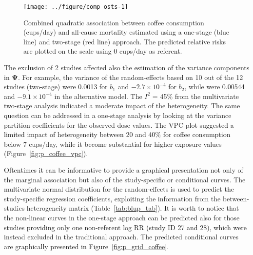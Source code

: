 \documentclass[11pt,a4paper,twoside,openany]{book}\usepackage{knitr}
\begin{document}
{\begin{knitrout}
\begin{figure}[ht!]
{\centering \texttt{[image: ../figure/comp\_osts-1]} 

}

\caption[Combined quadratic association between coffee consumption (cups/day) and all-cause mortality estimated using a one-stage (blue line) and two-stage (red line) approach]{Combined quadratic association between coffee consumption (cups/day) and all-cause mortality estimated using a one-stage (blue line) and two-stage (red line) approach. The predicted relative risks are plotted on the scale using 0 cups/day as referent.}\label{fig:comp_osts}
\end{figure}


\end{knitrout}

\noindent The exclusion of 2 studies affected also the estimation of the variance components in $\boldsymbol{\Psi}$. For example, the variance of the random-effects based on 10 out of the 12 studies (two-stage) were 0.0013 for $b_1$ and \ensuremath{-2.7\times 10^{-4}} for $b_2$, while were 0.00544 and \ensuremath{-9.1\times 10^{-4}} in the alternative model. The $I^2$ = 45\% from the multivariate two-stage analysis indicated a moderate impact of the heterogeneity. The same question can be addressed in a one-stage analysis by looking at the variance partition coefficients for the observed dose values. The VPC plot suggested a limited impact of heterogeneity between 20 and 40\% for coffee consumption below 7 cups/day, while it become substantial for higher exposure values (Figure~\ref{fig:p_coffee_vpc}).

Oftentimes it can be informative to provide a graphical presentation not only of the marginal association but also of the study-specific or conditional curves. The multivariate normal distribution for the random-effects is used to predict the study-specific regression coefficients, exploiting the information from the between-studies heterogeneity matrix (Table~\ref{tab:blup_tab}). 
It is worth to notice that the non-linear curves in the one-stage approach can be predicted also for those studies providing only one non-referent log RR (study ID 27 and 28), which were instead excluded in the traditional approach. The predicted conditional curves are graphically presented in Figure~\ref{fig:p_grid_coffee}.

\begin{knitrout}\footnotesize
{}\color{fgcolor}\begin{figure}[ht!]


\end{figure}
\end{knitrout}}
\end{document}
